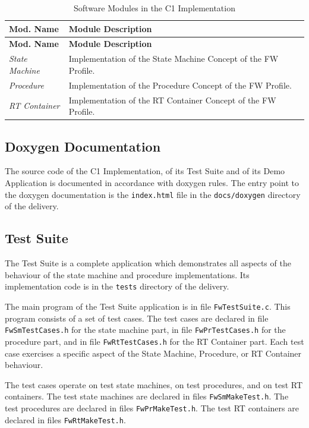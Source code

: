 \documentclass[a4paper,10pt]{article}
\begin{document}
\begin{longtable}{|p{2.3cm}|p{6.4cm}|}
\caption{Software Modules in the C1 Implementation} \label{tab:swpkg}\\
\hline
\rowcolor{gray}
\textbf{Mod. Name} & \textbf{Module Description} \\
\hline\hline
\endfirsthead
\rowcolor{gray}
\textbf{Mod. Name} & \textbf{Module Description} \\
\hline\hline
\endhead
%
\emph{State Machine} & Implementation of the State Machine Concept of the FW Profile. \\
\hline
\emph{Procedure} & Implementation of the Procedure Concept of the FW Profile. \\
\hline
\emph{RT Container} & Implementation of the RT Container Concept of the FW Profile. \\
\hline
\end{longtable}

\subsection{Doxygen Documentation}\label{sec:doxygenDoc}
The source code of the C1 Implementation, of its Test Suite and of its Demo Application is documented in accordance with doxygen rules. The entry point to the doxygen documentation is the \texttt{index.html} file in the \texttt{docs/doxygen} directory of the delivery.

\subsection{Test Suite}\label{sec:testSuite}
The Test Suite is a complete application which demonstrates all aspects of the behaviour of the state machine and procedure implementations. Its implementation code is in the \texttt{tests} directory of the delivery.

The main program of the Test Suite application is in file \texttt{FwTestSuite.c}. 
This program consists of a set of test cases. 
The test cases are declared in file \texttt{FwSmTestCases.h} for the state machine part, in file \texttt{FwPrTestCases.h} for the procedure part, and in file \texttt{FwRtTestCases.h} for the RT Container part. 
Each test case exercises a specific aspect of the State Machine, Procedure, or RT Container behaviour.

The test cases operate on test state machines, on test procedures, and on test RT containers. 
The test state machines are declared in files \texttt{FwSmMakeTest.h}. 
The test procedures are declared in files \texttt{FwPrMakeTest.h}.
The test RT containers are declared in files \texttt{FwRtMakeTest.h}.
\end{document}

